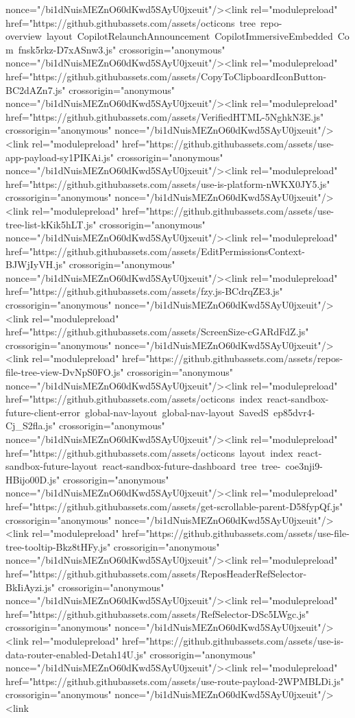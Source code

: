 nonce="/bi1dNuisMEZnO60dKwd5SAyU0jxeuit"/><link rel="modulepreload" href="https://github.githubassets.com/assets/octicons~tree~repo-overview~layout~CopilotRelaunchAnnouncement~CopilotImmersiveEmbedded~Com~fnsk5rkz-D7xASnw3.js" crossorigin="anonymous" nonce="/bi1dNuisMEZnO60dKwd5SAyU0jxeuit"/><link rel="modulepreload" href="https://github.githubassets.com/assets/CopyToClipboardIconButton-BC2dAZn7.js" crossorigin="anonymous" nonce="/bi1dNuisMEZnO60dKwd5SAyU0jxeuit"/><link rel="modulepreload" href="https://github.githubassets.com/assets/VerifiedHTML-5NghkN3E.js" crossorigin="anonymous" nonce="/bi1dNuisMEZnO60dKwd5SAyU0jxeuit"/><link rel="modulepreload" href="https://github.githubassets.com/assets/use-app-payload-sy1PIKAi.js" crossorigin="anonymous" nonce="/bi1dNuisMEZnO60dKwd5SAyU0jxeuit"/><link rel="modulepreload" href="https://github.githubassets.com/assets/use-is-platform-nWKX0JY5.js" crossorigin="anonymous" nonce="/bi1dNuisMEZnO60dKwd5SAyU0jxeuit"/><link rel="modulepreload" href="https://github.githubassets.com/assets/use-tree-list-kKik5hLT.js" crossorigin="anonymous" nonce="/bi1dNuisMEZnO60dKwd5SAyU0jxeuit"/><link rel="modulepreload" href="https://github.githubassets.com/assets/EditPermissionsContext-BJWjIyVH.js" crossorigin="anonymous" nonce="/bi1dNuisMEZnO60dKwd5SAyU0jxeuit"/><link rel="modulepreload" href="https://github.githubassets.com/assets/fzy.js-BCdrqZE3.js" crossorigin="anonymous" nonce="/bi1dNuisMEZnO60dKwd5SAyU0jxeuit"/><link rel="modulepreload" href="https://github.githubassets.com/assets/ScreenSize-cGARdFdZ.js" crossorigin="anonymous" nonce="/bi1dNuisMEZnO60dKwd5SAyU0jxeuit"/><link rel="modulepreload" href="https://github.githubassets.com/assets/repos-file-tree-view-DvNpS0FO.js" crossorigin="anonymous" nonce="/bi1dNuisMEZnO60dKwd5SAyU0jxeuit"/><link rel="modulepreload" href="https://github.githubassets.com/assets/octicons~index~react-sandbox-future-client-error~global-nav-layout~global-nav-layout~SavedS~ep85dvr4-Cj_S2fla.js" crossorigin="anonymous" nonce="/bi1dNuisMEZnO60dKwd5SAyU0jxeuit"/><link rel="modulepreload" href="https://github.githubassets.com/assets/octicons~layout~index~react-sandbox-future-layout~react-sandbox-future-dashboard~tree~tree-~coe3nji9-HBijo00D.js" crossorigin="anonymous" nonce="/bi1dNuisMEZnO60dKwd5SAyU0jxeuit"/><link rel="modulepreload" href="https://github.githubassets.com/assets/get-scrollable-parent-D58fypQf.js" crossorigin="anonymous" nonce="/bi1dNuisMEZnO60dKwd5SAyU0jxeuit"/><link rel="modulepreload" href="https://github.githubassets.com/assets/use-file-tree-tooltip-Bkz8tHFy.js" crossorigin="anonymous" nonce="/bi1dNuisMEZnO60dKwd5SAyU0jxeuit"/><link rel="modulepreload" href="https://github.githubassets.com/assets/ReposHeaderRefSelector-BkIiAyzi.js" crossorigin="anonymous" nonce="/bi1dNuisMEZnO60dKwd5SAyU0jxeuit"/><link rel="modulepreload" href="https://github.githubassets.com/assets/RefSelector-DSc5LWgc.js" crossorigin="anonymous" nonce="/bi1dNuisMEZnO60dKwd5SAyU0jxeuit"/><link rel="modulepreload" href="https://github.githubassets.com/assets/use-is-data-router-enabled-Detah14U.js" crossorigin="anonymous" nonce="/bi1dNuisMEZnO60dKwd5SAyU0jxeuit"/><link rel="modulepreload" href="https://github.githubassets.com/assets/use-route-payload-2WPMBLDi.js" crossorigin="anonymous" nonce="/bi1dNuisMEZnO60dKwd5SAyU0jxeuit"/><link 